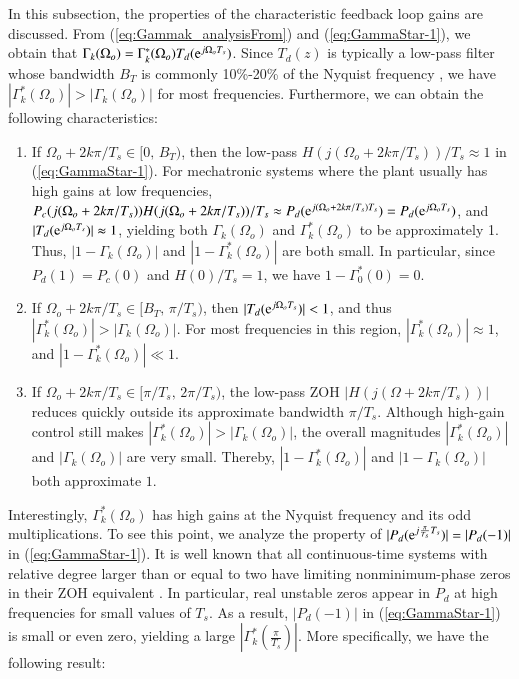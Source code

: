 \documentclass [11pt, proquest] {uwthesis}[2020/02/24]
\begin{document}
In this subsection, the properties of the characteristic feedback
loop gains are discussed. From (\ref{eq:Gammak_analysisFrom}) and
(\ref{eq:GammaStar-1}), we obtain that $\Gamma_{k}(\Omega_{o})=\Gamma_{k}^{*}(\Omega_{o})T_{d}(\mathrm{e}^{j\Omega_{o}T_{s}})$.
Since $T_{d}(z)$ is typically a low-pass filter whose bandwidth $B_{T}$
is commonly 10\%-20\% of the Nyquist frequency \cite{astrom_computer-controlled_1996},
we have $|\Gamma_{k}^{*}(\Omega_{o})|>|\Gamma_{k}(\Omega_{o})|$ for
most frequencies. Furthermore, we can obtain the following characteristics:
\begin{enumerate}
\item If \uline{\mbox{$\Omega_{o}+2k\pi/T_{s}\in[0,\,B_{T})$}}, then
the low-pass $H(j(\Omega_{o}+2k\pi/T_{s}))/T_{s}\approx1$ in (\ref{eq:GammaStar-1}).
For mechatronic systems where the plant usually has high gains at
low frequencies, $P_{c}(j(\Omega_{o}+2k\pi/T_{s}))H(j(\Omega_{o}+2k\pi/T_{s}))/T_{s}\approx P_{d}(\mathrm{e}^{j(\Omega_{o}+2k\pi/T_{s})T_{s}})=P_{d}(\mathrm{e}^{j\Omega_{o}T_{s}})$,
and $|T_{d}(\mathrm{e}^{j\Omega_{o}T_{s}})|\thickapprox1$, yielding both
$\Gamma_{k}(\Omega_{o})$ and $\Gamma_{k}^{*}(\Omega_{o})$ to be
approximately 1. Thus, $|1-\Gamma_{k}(\Omega_{o})|$ and $|1-\Gamma_{k}^{*}(\Omega_{o})|$
are both small. In particular, since $P_{d}(1)=P_{c}(0)$ \cite{Astrom1984_zerosOfSampledSys}
and $H(0)/T_{s}=1$, we have $1-\Gamma_{0}^{*}(0)=0$.
\item If \uline{\mbox{$\Omega_{o}+2k\pi/T_{s}\in[B_{T},\,\pi/T_{s})$}},
then $|T_{d}(\mathrm{e}^{j\Omega_{o}T_{s}})|<1$, and thus $|\Gamma_{k}^{*}(\Omega_{o})|>|\Gamma_{k}(\Omega_{o})|$.
For most frequencies in this region, $|\Gamma_{k}^{*}(\Omega_{o})|\approx1$,
and $|1-\Gamma_{k}^{*}(\Omega_{o})|\ll1$. 
\item If \uline{\mbox{$\Omega_{o}+2k\pi/T_{s}\in[\pi/T_{s},\,2\pi/T_{s})$}},
the low-pass ZOH $|H(j(\Omega+2k\pi/T_{s}))|$ reduces quickly outside
its approximate bandwidth $\pi/T_{s}$. Although high-gain control
still makes $|\Gamma_{k}^{*}(\Omega_{o})|>|\Gamma_{k}(\Omega_{o})|$,
the overall magnitudes $|\Gamma_{k}^{*}(\Omega_{o})|$ and $\left|\Gamma_{k}(\Omega_{o})\right|$
are very small. Thereby, $\left|1-\Gamma_{k}^{*}(\Omega_{o})\right|$
and $\left|1-\Gamma_{k}(\Omega_{o})\right|$ both approximate $1$. 
\end{enumerate}
%
Interestingly, $\Gamma_{k}^{*}(\Omega_{o})$ has high gains at the
Nyquist frequency and its odd multiplications. To see this point,
we analyze the property of $|P_{d}(\mathrm{e}^{j\frac{\pi}{T_{s}}T_{s}})|=|P_{d}(-1)|$
in (\ref{eq:GammaStar-1}). It is well known that all continuous-time
systems with relative degree larger than or equal to two have limiting
nonminimum-phase zeros in their ZOH equivalent \cite{Astrom1984_zerosOfSampledSys}.
In particular, real unstable zeros appear in $P_{d}$ at high frequencies
for small values of $T_{s}$. As a result, $\left|P_{d}(-1)\right|$
in (\ref{eq:GammaStar-1}) is small or even zero, yielding a large
$\left|\Gamma_{k}^{*}(\frac{\pi}{T_{s}})\right|$. More specifically,
we have the following result:
\end{document}
